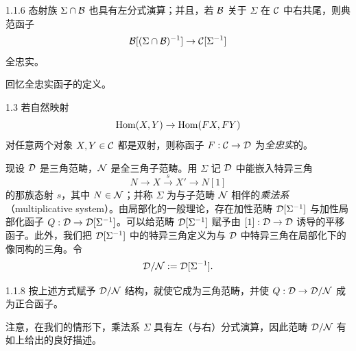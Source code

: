 \begin{lemma}[{{[}17{]}、{[}25{]}}]{1.1.6}
态射族 $\Sigma\cap\mathcal{B}$ 也具有左分式演算；并且，若 $\mathcal{B}$ 关于 $\Sigma$ 在 $\mathcal{C}$ 中右共尾，则典范函子
\begin{equation*}
\mathcal{B}[(\Sigma\cap\mathcal{B})^{-1}]\to\mathcal{C}[\Sigma^{-1}]
\end{equation*}
全忠实。
\end{lemma}

回忆全忠实函子的定义。

\begin{definition}{1.3}
若自然映射
\begin{equation*}
\operatorname{Hom}(X,Y)\to\operatorname{Hom}(FX,FY)
\end{equation*}
对任意两个对象 $X,Y\in\mathcal{C}$ 都是双射，则称函子 $F:\mathcal{C}\to\mathcal{D}$ 为\emph{全忠实}的。
\end{definition}


现设 $\mathcal{D}$ 是三角范畴，$\mathcal{N}$ 是全三角子范畴。用 $\Sigma$ 记 $\mathcal{D}$ 中能嵌入特异三角
\begin{equation*}
N\to X\xrightarrow{\ s\ }X'\to N[1]
\end{equation*}
的那族态射 $s$，其中 $N\in\mathcal{N}$；并称 $\Sigma$ 为与子范畴 $\mathcal{N}$ 相伴的\emph{乘法系}（multiplicative system）。由局部化的一般理论，存在加性范畴 $\mathcal{D}[\Sigma^{-1}]$ 与加性局部化函子 $Q:\mathcal{D}\to\mathcal{D}[\Sigma^{-1}]$。可以给范畴 $\mathcal{D}[\Sigma^{-1}]$ 赋予由 $[1]:\mathcal{D}\to\mathcal{D}$ 诱导的平移函子。此外，我们把 $\mathcal{D}[\Sigma^{-1}]$ 中的特异三角定义为与 $\mathcal{D}$ 中特异三角在局部化下的像同构的三角。令
\begin{equation*}
\mathcal{D}/\mathcal{N}:=\mathcal{D}[\Sigma^{-1}].
\end{equation*}

\begin{proposition}{1.1.8}
按上述方式赋予 $\mathcal{D}/\mathcal{N}$ 结构，就使它成为三角范畴，并使 $Q:\mathcal{D}\to\mathcal{D}/\mathcal{N}$ 成为正合函子。
\end{proposition}

注意，在我们的情形下，乘法系 $\Sigma$ 具有左（与右）分式演算，因此范畴 $\mathcal{D}/\mathcal{N}$ 有如上给出的良好描述。



